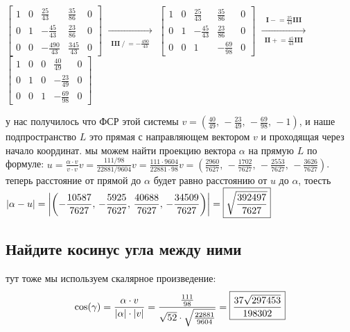 \documentclass{article}
\newcommand{\ds}{\displaystyle}
\renewcommand{\f}{\frac}
\renewcommand{\l}{\left}
\renewcommand{\r}{\right}
\begin{document}
  $\left[\begin{matrix}1 & 0 & \frac{25}{43} & \frac{35}{86} & 0\\0 & 1 & - \frac{45}{43} & \frac{23}{86} & 0\\0 & 0 & - \frac{490}{43} & \frac{345}{43} & 0\end{matrix}\right]$
  $\xrightarrow[\begin{matrix}  \\ \textbf{III} \mathrel{/}= - \frac{490}{43} \end{matrix}]{\begin{matrix}  \end{matrix}}$
  $\left[\begin{matrix}1 & 0 & \frac{25}{43} & \frac{35}{86} & 0\\0 & 1 & - \frac{45}{43} & \frac{23}{86} & 0\\0 & 0 & 1 & - \frac{69}{98} & 0\end{matrix}\right]$
  $\xrightarrow[\begin{matrix} \textbf{II} \mathrel{+}= \frac{45}{43} \textbf{III} \\  \end{matrix}]{\begin{matrix} \textbf{I} \mathrel{-}= \frac{25}{43} \textbf{III} \end{matrix}}$ \\
  $\left[\begin{matrix}1 & 0 & 0 & \frac{40}{49} & 0\\0 & 1 & 0 & - \frac{23}{49} & 0\\0 & 0 & 1 & - \frac{69}{98} & 0\end{matrix}\right]$

  \noindent
  у нас получилось что ФСР этой системы $\ds v = \l(\frac{40}{49},\, -\frac{23}{49},\, -\frac{69}{98},\, -1\r)$,
  и наше подпространство $L$ это прямая с направляющем вектором $v$ и проходящая через начало координат.
  мы можем найти проекцию вектора $\alpha$ на прямую $L$ по формуле:
  $\ds u = \f{\alpha \cdot v}{v \cdot v}v = \f{111/98}{22881/9604}v = \f{111 \cdot 9604}{22881 \cdot 98}v = \l(\f{2960}{7627},\, -\f{1702}{7627},\, -\f{2553}{7627},\, -\f{3626}{7627}\r)$.
  теперь расстояние от прямой до $\alpha$ будет равно расстоянию от $u$ до $\alpha$, тоесть $\ds\l|\alpha - u\r| = \l|\l(-\f{10587}{7627},\, -\f{5925}{7627},\, \f{40688}{7627},\, -\f{34509}{7627}\r)\r| = \fbox{$\ds \sqrt{\f{392497}{7627}}$}$

  \subsection{Найдите косинус угла между ними}
  тут тоже мы используем скалярное произведение:
  $$ \cos(\gamma) = \f{\alpha \cdot v}{\l|\alpha\r| \cdot \l|v\r|} = \f{\f{111}{98}}{\sqrt{52} \cdot \sqrt{\f{22881}{9604}}} = \fbox{$\ds \frac{37 \sqrt{297453}}{198302}$} $$
\end{document}
